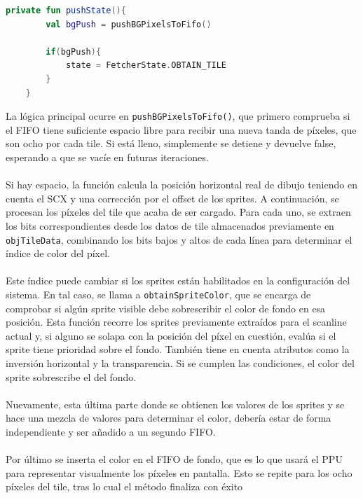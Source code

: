 \begin{lstlisting}[language=Kotlin, caption={FIFO Fetcher - Push.}, label={code:ppufifopush}]
    private fun pushState(){
        val bgPush = pushBGPixelsToFifo()

        if(bgPush){
            state = FetcherState.OBTAIN_TILE
        }
    }
\end{lstlisting}

La lógica principal ocurre en \texttt{pushBGPixelsToFifo()}, que primero comprueba si el FIFO tiene suficiente espacio libre para recibir una nueva tanda de píxeles, que son ocho por cada tile. Si está lleno, simplemente se detiene y devuelve false, esperando a que se vacíe en futuras iteraciones.
\\\\
Si hay espacio, la función calcula la posición horizontal real de dibujo teniendo en cuenta el SCX y una corrección por el offset de los sprites. A continuación, se procesan los píxeles del tile que acaba de ser cargado. Para cada uno, se extraen los bits correspondientes desde los datos de tile almacenados previamente en \texttt{objTileData}, combinando los bits bajos y altos de cada línea para determinar el índice de color del píxel.
\\\\
Este índice puede cambiar si los sprites están habilitados en la configuración del sistema. En tal caso, se llama a \texttt{obtainSpriteColor}, que se encarga de comprobar si algún sprite visible debe sobrescribir el color de fondo en esa posición. Esta función recorre los sprites previamente extraídos para el scanline actual y, si alguno se solapa con la posición del píxel en cuestión, evalúa si el sprite tiene prioridad sobre el fondo. También tiene en cuenta atributos como la inversión horizontal y la transparencia. Si se cumplen las condiciones, el color del sprite sobrescribe el del fondo.
\\\\
Nuevamente, esta última parte donde se obtienen los valores de los sprites y se hace una mezcla de valores para determinar el color, debería estar de forma independiente y ser añadido a un segundo FIFO.
\\\\
Por último se inserta el color en el FIFO de fondo, que es lo que usará el PPU para representar visualmente los píxeles en pantalla. Esto se repite para los ocho píxeles del tile, tras lo cual el método finaliza con éxito

